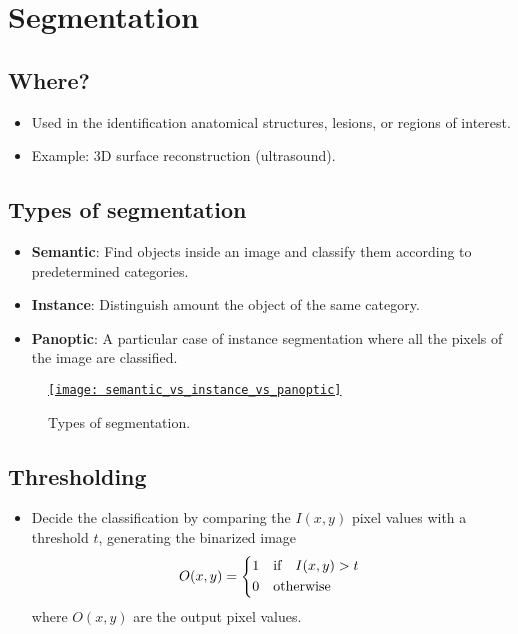 \chapter{Segmentation}

\section{Where?}
\begin{itemize}
\item Used in the identification anatomical structures, lesions, or regions of interest.
\item Example: 3D surface reconstruction (ultrasound).
\end{itemize}
  
\section{Types of segmentation}

\begin{itemize}
\item \textbf{Semantic}: Find objects inside an image and classify them according to predetermined categories.
\item \textbf{Instance}: Distinguish amount the object of the same category.
\item \textbf{Panoptic}: A particular case of instance segmentation where all the pixels of the image are classified.
\end{itemize}

\begin{figure}[H]
  \vspace{-0ex}
  \centering
  \href{https://www.labellerr.com/blog/semantic-vs-instance-vs-panoptic-which-image-segmentation-technique-to-choose/}{\texttt{[image: semantic\_vs\_instance\_vs\_panoptic]}}
  \caption{Types of segmentation.}
  \label{fig:types_segmentation}
\end{figure}

\section{Thresholding \cite{gonzalez2009digital}}
\begin{itemize}
\item Decide the classification by comparing the $I(x,y)$ pixel values with a threshold $t$, generating the binarized image
  \begin{equation}
    O(x,y) = \begin{cases*}
      1 & {\text if}\quad $I(x,y)>t$ \\
      0 & {\text otherwise}
    \end{cases*} 
  \end{equation}
  where $O(x,y)$ are the output pixel values.
\end{itemize}

